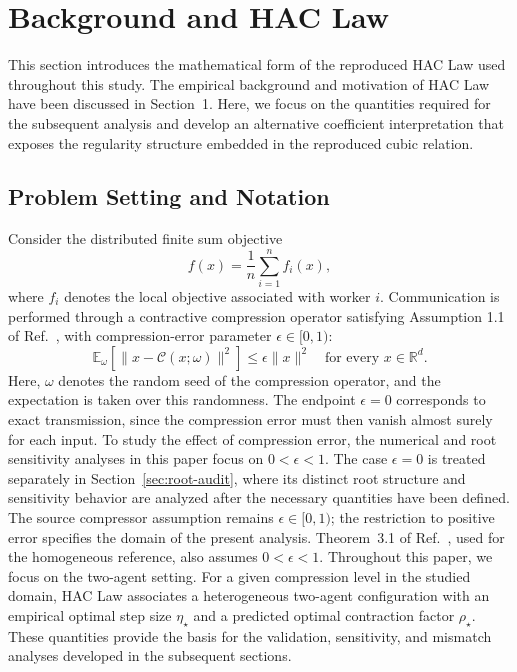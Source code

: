 \documentclass[mathematics,article,submit,moreauthors]{Definitions/mdpi}
\begin{document}
\section{Background and HAC Law} 
This section introduces the mathematical form of the reproduced HAC Law used throughout this study. The empirical background and motivation of HAC Law have been discussed in Section~1. Here, we focus on the quantities required for the subsequent analysis and develop an alternative coefficient interpretation that exposes the regularity structure embedded in the reproduced cubic relation.

\subsection{Problem Setting and Notation} \label{sec:problem-setting} 
Consider the distributed finite sum objective \[ f(x)=\frac{1}{n}\sum_{i=1}^{n} f_i(x), \] where \(f_i\) denotes the local objective associated with worker \(i\). Communication is performed through a contractive compression operator satisfying Assumption 1.1 of Ref.~\cite{thomsen2026tight}, with compression-error parameter \(\epsilon\in[0,1)\): \[ \mathbb{E}_{\omega}\!\left[\|x-\mathcal{C}(x;\omega)\|^2\right] \leq \epsilon\|x\|^2 \quad \text{for every }x\in\mathbb{R}^d. \] Here, \(\omega\) denotes the random seed of the compression operator, and the expectation is taken over this randomness. The endpoint \(\epsilon=0\) corresponds to exact transmission, since the compression error must then vanish almost surely for each input. To study the effect of compression error, the numerical and root sensitivity analyses in this paper focus on \(0<\epsilon<1\). The case \(\epsilon=0\) is treated separately in Section~\ref{sec:root-audit}, where its distinct root structure and sensitivity behavior are analyzed after the necessary quantities have been defined. The source compressor assumption remains \(\epsilon\in[0,1)\); the restriction to positive error specifies the domain of the present analysis. Theorem~3.1 of Ref.~\cite{thomsen2026tight}, used for the homogeneous reference, also assumes \(0<\epsilon<1\). Throughout this paper, we focus on the two-agent setting. For a given compression level in the studied domain, HAC Law associates a heterogeneous two-agent configuration with an empirical optimal step size \(\eta_\star\) and a predicted optimal contraction factor \(\rho_\star\). These quantities provide the basis for the validation, sensitivity, and mismatch analyses developed in the subsequent sections. 
\end{document}

